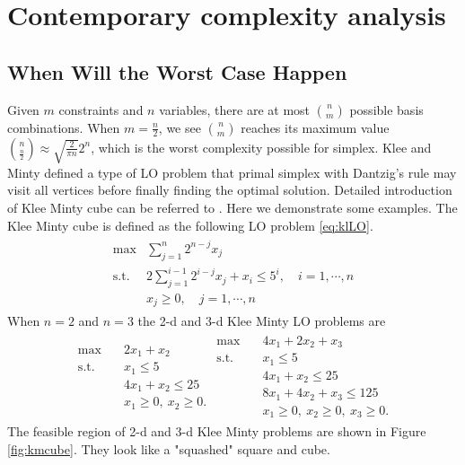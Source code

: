 \documentclass[11pt]{article}
\begin{document}
\section{Contemporary complexity analysis}
\subsection{When Will the Worst Case Happen} \label{secworst}
Given $m$ constraints and $n$ variables, there are at most $\binom{n}{m}$ possible basis combinations. When $m=\frac{n}{2}$, we see $\binom{n}{m}$ reaches its maximum value $\binom{n}{\frac{n}{2}}\approx \sqrt{\frac{2}{\pi n}}2^n$,  which is the worst complexity possible for simplex. Klee and Minty defined a type of LO problem that primal simplex with Dantzig's rule may visit all vertices before finally finding the optimal solution. Detailed introduction of Klee Minty cube can be referred to \cite{vanderbei2020linear}. Here we demonstrate some examples. The Klee Minty cube is defined as the following LO problem \ref{eq:klLO}. 
\begin{align}
\begin{split}
\max &\sum_{j=1}^n 2^{n-j}x_j \\
\text{s.t. } & 2\sum_{j=1}^{i-1}2^{i-j}x_j + x_i \le 5^i, \quad i=1,\cdots,n\\
			&x_j \ge 0,  \quad j=1,\cdots,n
\end{split}\label{eq:klLO}
\end{align} 
When $n=2$ and $n=3$ the 2-d and 3-d Klee Minty LO problems are 
\begin{align*}
\begin{split}
\max \quad & 2x_1 + x_2 \\
\text{s.t. }\quad  & x_1 \le 5\\
& 4x_1 + x_2 \le 25\\
& x_1 \ge 0,\ x_2 \ge 0.
\end{split}
\begin{split}
\max \quad & 4x_1 + 2x_2 + x_3 \\
\text{s.t. }\quad  & x_1 \le 5\\
& 4x_1 + x_2 \le 25\\
& 8x_1 + 4x_2 + x_3 \le 125\\
& x_1 \ge 0,\ x_2 \ge 0, \ x_3 \ge 0.
\end{split}
\end{align*}
The feasible region of 2-d and 3-d Klee Minty problems are shown in Figure \ref{fig:kmcube}. They look like a "squashed" square and cube.
\end{document}
